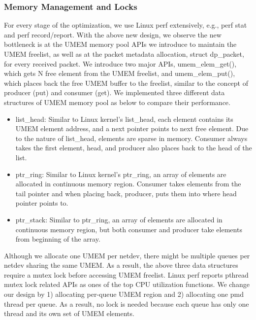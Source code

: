 \documentclass[10pt]{sigplanconf}
\begin{document}
\subsubsection{Memory Management and Locks}\label{memorym}
For every stage of the optimization, we use Linux perf extensively, e.g., perf stat
and perf record/report.  With the above new design, we observe the new bottleneck
is at the UMEM memory pool APIs we introduce to maintain the UMEM freelist, as well as at the
packet metadata allocation, struct dp\_packet, for every received packet.
We introduce two major APIs, umem\_elem\_get(), which gets N free element from the
UMEM freelist, and umem\_elem\_put(), which places back the free UMEM buffer to
the freelist, similar to the concept of producer (put) and consumer (get).
We implemented three different data structures of UMEM memory pool as below
to compare their performance.
\begin{itemize}
\item list\_head: Similar to Linux kernel's list\_head, each element contains its
UMEM element address, and a next pointer points to next free element.
Due to the nature of list\_head, elements are sparse in memory.
Consumer always takes the first element, head, and producer also places back
to the head of the list.
\item ptr\_ring: Similar to Linux kernel's ptr\_ring, an array of elements are
allocated in continuous memory region.
Consumer takes elements from the tail pointer and when placing back, producer, puts
them into where head pointer points to.
\item ptr\_stack: Similar to ptr\_ring, an array of elements are allocated
in continuous memory region, but both consumer and producer take elements
from beginning of the array.
\end{itemize}

Although we allocate one UMEM per netdev, there might be multiple queues per
netdev sharing the same UMEM. As a result, the above three data structures
require a mutex lock before accessing UMEM freelist. Linux perf reports
pthread mutex lock related APIs as ones of the top CPU utilization functions.
We change our design by 1) allocating per-queue UMEM region and 2)
allocating one pmd thread per queue. As a result, no lock is needed because
each queue has only one thread and its own set of UMEM elements.
\end{document}
